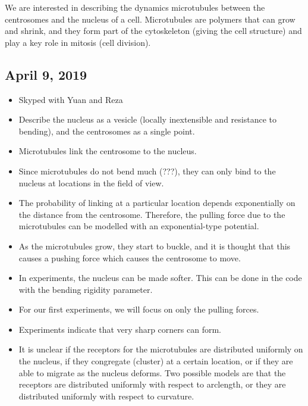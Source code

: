\documentclass[11pt]{article}
\begin{document}
We are interested in describing the dynamics microtubules between the
centrosomes and the nucleus of a cell.  Microtubules are polymers that
can grow and shrink, and they form part of the cytoskeleton (giving the
cell structure) and play a key role in mitosis (cell division).

\subsection*{April 9, 2019}
\begin{itemize}
  \item Skyped with Yuan and Reza

  \item Describe the nucleus as a vesicle (locally inextensible and
  resistance to bending), and the centrosomes as a single point.

  \item Microtubules link the centrosome to the nucleus.

  \item Since microtubules do not bend much (???), they can only bind to
  the nucleus at locations in the field of view.

  \item The probability of linking at a particular location depends
  exponentially on the distance from the centrosome.  Therefore, the
  pulling force due to the microtubules can be modelled with an
  exponential-type potential.

  \item As the microtubules grow, they start to buckle, and it is
  thought that this causes a pushing force which causes the centrosome
  to move.

  \item In experiments, the nucleus can be made softer.  This can be
  done in the code with the bending rigidity parameter.

  \item For our first experiments, we will focus on only the pulling
  forces.

  \item Experiments indicate that very sharp corners can form.

  \item It is unclear if the receptors for the microtubules are
  distributed uniformly on the nucleus, if they congregate (cluster)
  at a certain location, or if they are able to migrate as the nucleus
  deforms.  Two possible models are that the receptors are distributed
  uniformly with respect to arclength, or they are distributed uniformly
  with respect to curvature.
\end{itemize}
\end{document}
